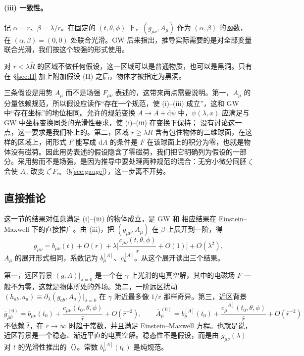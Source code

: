 \documentclass[11pt,a4paper]{ctexart}
\newcommand{\dd}{\mathrm d}
\begin{document}
\paragraph{(iii) 一致性。}记 $\alpha=r$、$\beta=\lambda/r$。在固定的 $(t,\theta,\phi)$ 下，$(g_{\mu\nu},A_\mu)$ 作为 $(\alpha,\beta)$ 的函数，在 $(\alpha,\beta)=(0,0)$ 处联合光滑。GW 后来指出，推导实际需要的是对全部变量联合光滑，我们按这个较强的形式使用。

\medskip
对 $r<\lambda\bar R$ 的区域不做任何假设，这一区域可以是普通物质，也可以是黑洞。只有在 \S\ref{sec:H} 加上附加假设 (H) 之后，物体才被指定为黑洞。

三条假设是用势 $A_\mu$ 而不是场强 $F_{\mu\nu}$ 表述的，这带来两点需要说明。第一，$A_\mu$ 的分量依赖规范，所以假设应读作“存在一个规范，使 (i)--(iii) 成立”，这和 GW 中“存在坐标”的地位相同。允许的规范变换 $A\to A+\dd\psi$ 中，$\psi(\lambda,x)$ 应满足与 GW 中坐标变换同类的光滑性要求，使 (i)--(iii) 在变换下保持；\citet{Gralla2010} 没有讨论这一点，这一要求是我们补上的。第二，区域 $r\ge\lambda\bar R$ 含有包住物体的二维球面，在这样的区域上，闭形式 $F$ 能写成 $\dd A$ 的条件是 $F$ 在该球面上的积分为零，也就是物体没有磁荷。因此用势表述的假设隐含了零磁荷，我们把它明确列为假设的一部分。采用势而不是场强，是因为推导中要处理两种规范的混合：无穷小微分同胚 $\zeta$ 会使 $A_a$ 改变 $\zeta^cF_{ca}$（\S\ref{sec:gauge}），这一步离不开势。

\subsection{直接推论}\label{sec:consequences}

这一节的结果对任意满足 (i)--(iii) 的物体成立，是 GW 和 \citet{Gralla2010} 相应结果在 Einstein--Maxwell 下的直接推广。由 (iii)，把 $(g_{\mu\nu},A_\mu)$ 在 $\beta$ 上展开到一阶，得
\begin{equation}
g_{\mu\nu}=b_{\mu\nu}(t)+O(r)+\lambda\Big[\frac{c_{\mu\nu}(t,\theta,\phi)}{r}+O(1)\Big]+O(\lambda^2),
\label{eq:beta-exp}
\end{equation}
$A_\mu$ 的展开形式相同，系数记为 $b^{[A]}_\mu$、$c^{[A]}_\mu$。从这个展开读出三个结果。

第一，远区背景 $(g,A)|_{\lambda=0}$ 是一个在 $\gamma$ 上光滑的电真空解，其中的电磁场 $F$ 一般不为零，这就是物体所处的外场。第二，一阶远区扰动 $(h_{ab},a_a)\equiv\partial_\lambda(g_{ab},A_a)|_{\lambda=0}$ 在 $\gamma$ 附近最多像 $1/r$ 那样奇异。第三，近区背景
\begin{equation}
\bar g^{(0)}_{\bar\mu\bar\nu}=b_{\mu\nu}(t_0)+\frac{c_{\mu\nu}(t_0,\theta,\phi)}{\bar r}+O(\bar r^{-2}),\qquad
\bar A^{(0)}_{\bar\mu}=b^{[A]}_\mu(t_0)+\frac{c^{[A]}_\mu(t_0,\theta,\phi)}{\bar r}+O(\bar r^{-2})
\label{eq:nearzone-bg}
\end{equation}
不依赖 $\bar t$，在 $\bar r\to\infty$ 时趋于常数，并且满足 Einstein--Maxwell 方程。也就是说，近区背景是一个稳态、渐近平直的电真空解。稳态性不是假设，而是由 $g_{\mu\nu}(\lambda)$ 对 $t$ 的光滑性推出的（\citealt{GrallaWald2008,Gralla2010}）。常数 $b^{[A]}_\mu(t_0)$ 是纯规范。
\end{document}
